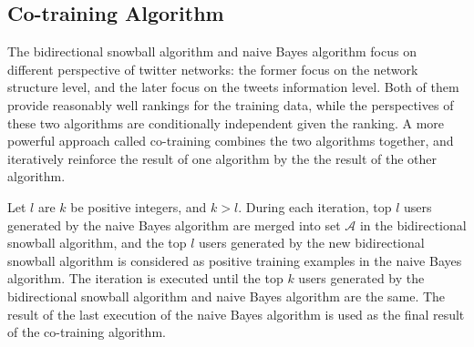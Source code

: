 \documentclass{article}
\begin{document}
\subsection{Co-training Algorithm}


The bidirectional snowball algorithm and naive Bayes algorithm focus on different perspective of twitter networks: the former focus on the network structure level, and the later focus on the tweets information level. Both of them provide reasonably well rankings for the training data, while the perspectives of these two algorithms are conditionally independent given the ranking. A more powerful approach called co-training \cite{cotraining} combines the two algorithms together, and iteratively reinforce the result of one algorithm by the the result of the other algorithm.


Let $l$ are $k$ be positive integers, and $k > l$. During each iteration, top $l$ users generated by the naive Bayes algorithm are merged into set $\mathcal{A}$ in the bidirectional snowball algorithm, and the top $l$ users generated by the new bidirectional snowball algorithm is considered as positive training examples in the naive Bayes algorithm. The iteration is executed until the top $k$ users generated by the bidirectional snowball algorithm and naive Bayes algorithm are the same. The result of the last execution of the naive Bayes algorithm is used as the final result of the co-training algorithm.


\ifx \allfiles \undefined
\end{document}
